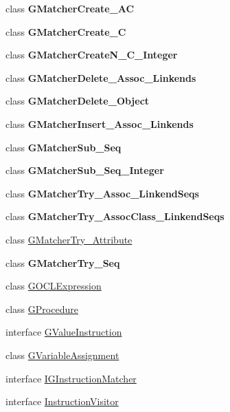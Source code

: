 \begin{DoxyCompactItemize}
\item 
class {\bfseries G\-Matcher\-Create\-\_\-\-A\-C}
\item 
class {\bfseries G\-Matcher\-Create\-\_\-\-C}
\item 
class {\bfseries G\-Matcher\-Create\-N\-\_\-\-C\-\_\-\-Integer}
\item 
class {\bfseries G\-Matcher\-Delete\-\_\-\-Assoc\-\_\-\-Linkends}
\item 
class {\bfseries G\-Matcher\-Delete\-\_\-\-Object}
\item 
class {\bfseries G\-Matcher\-Insert\-\_\-\-Assoc\-\_\-\-Linkends}
\item 
class {\bfseries G\-Matcher\-Sub\-\_\-\-Seq}
\item 
class {\bfseries G\-Matcher\-Sub\-\_\-\-Seq\-\_\-\-Integer}
\item 
class {\bfseries G\-Matcher\-Try\-\_\-\-Assoc\-\_\-\-Linkend\-Seqs}
\item 
class {\bfseries G\-Matcher\-Try\-\_\-\-Assoc\-Class\-\_\-\-Linkend\-Seqs}
\item 
class \hyperlink{classorg_1_1tzi_1_1use_1_1gen_1_1assl_1_1statics_1_1_g_matcher_try___attribute}{G\-Matcher\-Try\-\_\-\-Attribute}
\item 
class {\bfseries G\-Matcher\-Try\-\_\-\-Seq}
\item 
class \hyperlink{classorg_1_1tzi_1_1use_1_1gen_1_1assl_1_1statics_1_1_g_o_c_l_expression}{G\-O\-C\-L\-Expression}
\item 
class \hyperlink{classorg_1_1tzi_1_1use_1_1gen_1_1assl_1_1statics_1_1_g_procedure}{G\-Procedure}
\item 
interface \hyperlink{interfaceorg_1_1tzi_1_1use_1_1gen_1_1assl_1_1statics_1_1_g_value_instruction}{G\-Value\-Instruction}
\item 
class \hyperlink{classorg_1_1tzi_1_1use_1_1gen_1_1assl_1_1statics_1_1_g_variable_assignment}{G\-Variable\-Assignment}
\item 
interface \hyperlink{interfaceorg_1_1tzi_1_1use_1_1gen_1_1assl_1_1statics_1_1_i_g_instruction_matcher}{I\-G\-Instruction\-Matcher}
\item 
interface \hyperlink{interfaceorg_1_1tzi_1_1use_1_1gen_1_1assl_1_1statics_1_1_instruction_visitor}{Instruction\-Visitor}
\end{DoxyCompactItemize}
